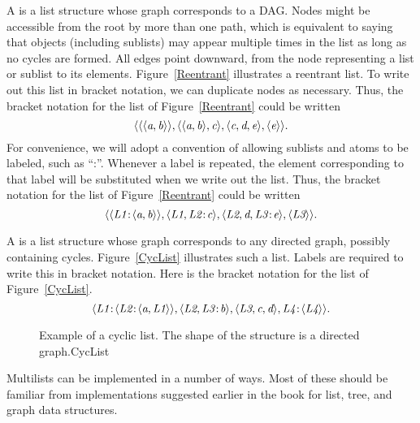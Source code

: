A  is a list structure whose graph corresponds
to a DAG.
Nodes might be accessible from the root by more than
one path, which is equivalent to saying that objects (including
sublists) may appear multiple times in the list as long as no cycles
are formed.
All edges point downward, from the node representing a list or sublist
to its elements.
Figure~\ref{Reentrant} illustrates a reentrant list. 
To write out this list in bracket notation, we can duplicate nodes
as necessary.
Thus, the bracket notation for the list of Figure~\ref{Reentrant}
could be written
\[\langle\langle\langle {\textit{a}}, {\textit{b}}\rangle\rangle,
\langle\langle{\textit{a}}, {\textit{b}}\rangle, {\textit{c}}\rangle,
\langle{\textit{c}}, {\textit{d}}, {\textit{e}}\rangle,
\langle{\textit{e}}\rangle\rangle.\]
\noindent For convenience, we will adopt a
convention of allowing sublists and atoms to be labeled,
such as ``:''.
Whenever a label is repeated, the element corresponding to that label
will be substituted when we write out the list.
Thus, the bracket notation for the list of Figure~\ref{Reentrant}
could be written
\[\langle\langle{\textit{L1}}\!:\!\langle{\textit{a}}, {\textit{b}}\rangle\rangle,
\langle{\textit{L1}}, {\textit{L2}}\!:\!{\textit{c}}\rangle,
\langle{\textit{L2}}, {\textit{d}}, {\textit{L3}}\!:\!{\textit{e}}\rangle,
\langle{\textit{L3}}\rangle\rangle.\]

A  is a list structure whose graph corresponds to
any directed graph, possibly containing cycles.
Figure~\ref{CycList} illustrates such a list.
Labels are required to write this in bracket notation.
Here is the bracket notation for the list of Figure~\ref{CycList}.
\[\langle\svar{L1}\!:\!\langle\svar{L2}\!:\!\langle\svar{a},
\svar{L1}\rangle\rangle, \langle\svar{L2},
\svar{L3}\!:\!\svar{b}\rangle, \langle\svar{L3}, \svar{c}, \svar{d}\rangle,
\svar{L4}\!:\!\langle\svar{L4}\rangle\rangle.\]

\begin{figure}
\vspace{-\bigskipamount}\vspace{-\medskipamount}
{Example of a cyclic list.
The shape of the structure is a directed graph.}{CycList}
\bigskip
\end{figure}

Multilists can be implemented in a number of ways.
Most of these should be familiar from implementations suggested
earlier in the book for list, tree, and graph
data structures.

